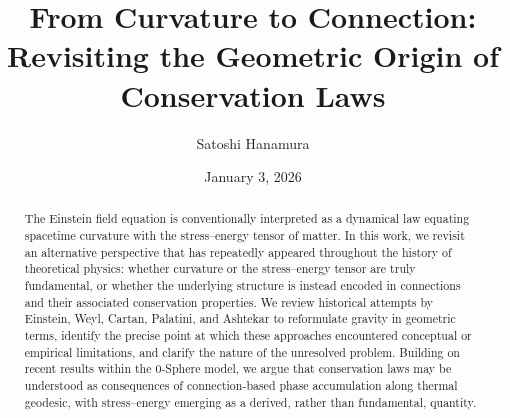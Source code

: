 \documentclass[%
 reprint,
 amsmath,amssymb,
 aps,
 prb,
]{revtex4-2}
\numberwithin{equation}{section}
\begin{document}
\title{From Curvature to Connection:\\
Revisiting the Geometric Origin of Conservation Laws}

\author{Satoshi Hanamura}
\date{January 3, 2026}

\begin{abstract}
The Einstein field equation is conventionally interpreted as a dynamical law equating spacetime curvature with the stress--energy tensor of matter. In this work, we revisit an alternative perspective that has repeatedly appeared throughout the history of theoretical physics: whether curvature or the stress--energy tensor are truly fundamental, or whether the underlying structure is instead encoded in connections and their associated conservation properties. We review historical attempts by Einstein, Weyl, Cartan, Palatini, and Ashtekar to reformulate gravity in geometric terms, identify the precise point at which these approaches encountered conceptual or empirical limitations, and clarify the nature of the unresolved problem. Building on recent results within the 0-Sphere model, we argue that conservation laws may be understood as consequences of connection-based phase accumulation along thermal geodesic, with stress--energy emerging as a derived, rather than fundamental, quantity.
\end{abstract}

\end{document}
